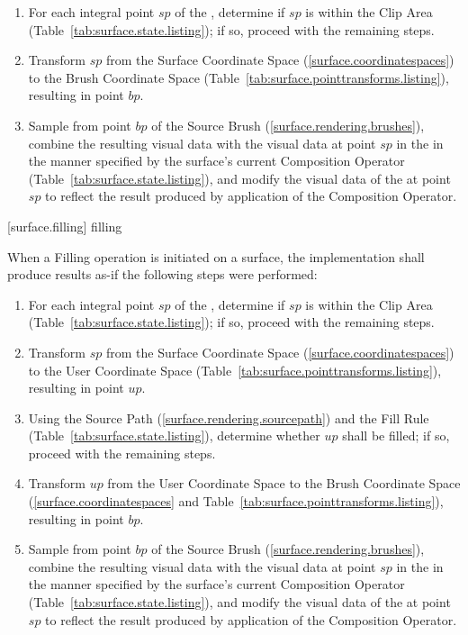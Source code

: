 \begin{enumerate}
\item For each integral point $sp$ of the \underlyingsurface, determine if $sp$ is within the Clip Area (Table~\ref{tab:surface.state.listing}); if so, proceed with the remaining steps.
\item Transform $sp$ from the Surface Coordinate Space (\ref{surface.coordinatespaces}) to the Brush Coordinate Space (Table~\ref{tab:surface.pointtransforms.listing}), resulting in point $bp$.
\item Sample from point $bp$ of the Source Brush (\ref{surface.rendering.brushes}), combine the resulting visual data with the visual data at point $sp$ in the \underlyingsurface in the manner specified by the surface's current Composition Operator (Table~\ref{tab:surface.state.listing}), and modify the visual data of the \underlyingsurface at point $sp$ to reflect the result produced by application of the Composition Operator.
\end{enumerate}

 [surface.filling] { filling}

\pnum
When a Filling operation is initiated on a surface, the implementation shall produce results as-if the following steps were performed:

\begin{enumerate}
\item For each integral point $sp$ of the \underlyingsurface, determine if $sp$ is within the Clip Area (Table~\ref{tab:surface.state.listing}); if so, proceed with the remaining steps.
\item Transform $sp$ from the Surface Coordinate Space (\ref{surface.coordinatespaces}) to the User Coordinate Space (Table~\ref{tab:surface.pointtransforms.listing}), resulting in point $up$.
\item Using the Source Path (\ref{surface.rendering.sourcepath}) and the Fill Rule (Table~\ref{tab:surface.state.listing}), determine whether $up$ shall be filled; if so, proceed with the remaining steps.
\item Transform $up$ from the User Coordinate Space to the Brush Coordinate Space (\ref{surface.coordinatespaces} and Table~\ref{tab:surface.pointtransforms.listing}), resulting in point $bp$.
\item Sample from point $bp$ of the Source Brush (\ref{surface.rendering.brushes}), combine the resulting visual data with the visual data at point $sp$ in the \underlyingsurface in the manner specified by the surface's current Composition Operator (Table~\ref{tab:surface.state.listing}), and modify the visual data of the \underlyingsurface at point $sp$ to reflect the result produced by application of the Composition Operator.
\end{enumerate}

